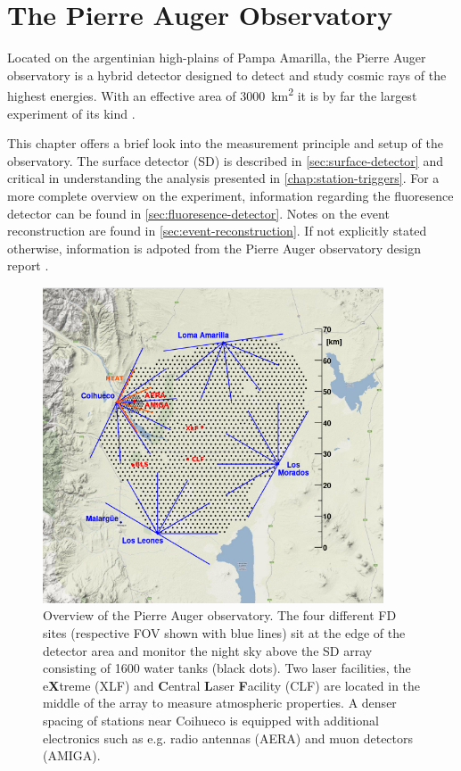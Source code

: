 
\chapter{The Pierre Auger Observatory}
\label{chap:auger-observatory}

Located on the argentinian high-plains of Pampa Amarilla, the Pierre Auger observatory is a hybrid detector designed to detect and study cosmic 
rays of the highest energies. With an effective area of \SI{3000}{\kilo\meter\squared} it is by far the largest experiment of its kind 
\cite{DesignReport}.

This chapter offers a brief look into the measurement principle and setup of the observatory. The  surface detector (SD) is described in 
\autoref{sec:surface-detector} and critical in understanding the analysis presented in \autoref{chap:station-triggers}. For a more complete 
overview on the experiment, information regarding the fluoresence detector can be found in \autoref{sec:fluoresence-detector}. Notes on the event
reconstruction are found in \autoref{sec:event-reconstruction}. If not explicitly stated otherwise, information is adpoted from the Pierre Auger 
observatory design report \cite{DesignReport}. 

\begin{figure}
	\centering
	\includegraphics[width=0.9\textwidth]{imgs/auger_array.png}
	\caption{Overview of the Pierre Auger observatory. The four different FD sites (respective FOV shown with blue lines) sit at the edge of
	the detector area and monitor the night sky above the SD array consisting of 1600 water tanks (black dots). Two laser facilities, the 
	e\textbf{X}treme (XLF) and \textbf{C}entral \textbf{L}aser \textbf{F}acility (CLF) are located in the middle of the array to measure 
	atmospheric properties. A denser spacing of stations near Coihueco is equipped with additional electronics such as e.g. radio antennas 
	(AERA) and muon detectors (AMIGA).}
	\label{fig:auger-array}
\end{figure}

